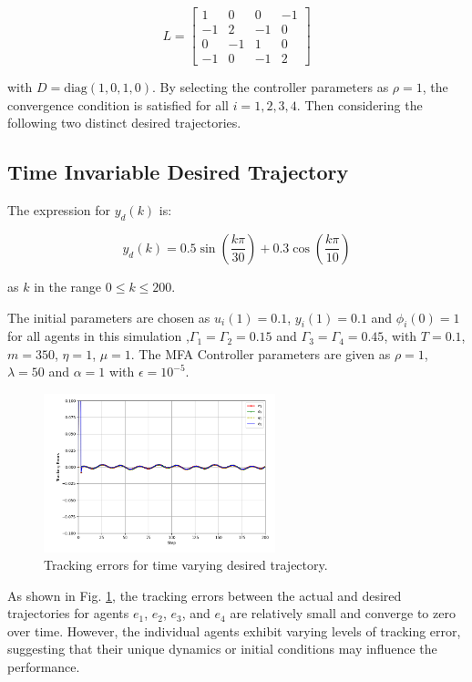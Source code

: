 \documentclass[journal,onecolumn]{IEEEtran}
\begin{document}
\[
    L = \begin{bmatrix}
    1 & 0 & 0 & -1 \\
    -1 & 2 & -1 & 0 \\
    0 & -1 & 1 & 0 \\
    -1 & 0 & -1 & 2
    \end{bmatrix}
\]

with \( D = \text{diag}(1, 0, 1, 0) \). By selecting the controller parameters as \( \rho = 1 \), the convergence condition  is satisfied for all \( i = 1, 2, 3, 4 \). Then considering the following two distinct desired trajectories.


\subsection{Time Invariable Desired Trajectory}

The expression for \( y_d(k) \) is:

\[
y_d(k) = 0.5 \sin\left(\frac{k \pi}{30}\right) + 0.3  \cos\left(\frac{k \pi}{10}\right)
\]

as \( k \) in the range \( 0 \leq k \leq 200 \).

The initial parameters are chosen as \(u_i(1)=0.1\), \(y_i(1)=0.1\) and \(\phi_i(0)=1 \) for all agents in this simulation ,\(\Gamma_{1}=\Gamma_{2}=0.15\) and \(\Gamma_{3}=\Gamma_{4}=0.45\), with \(T=0.1\), \(m=350\), \(\eta=1\), \(\mu=1\). The MFA Controller parameters are given as \(\rho=1\), \(\lambda=50\) and \(\alpha=1\) with \(\epsilon=10^{-5}\).
\begin{figure}[h!]
    \centering
    \includegraphics[width=0.6\textwidth]{Figure_2.png}
    \caption{Tracking errors for time varying desired trajectory.}
    \label{fig:figure_2} %
\end{figure}

As shown in Fig. \ref{fig:figure_2}, the tracking errors between the actual and desired trajectories for agents $e_1$, $e_2$, $e_3$, and $e_4$ are relatively small and converge to zero over time. However, the individual agents exhibit varying levels of tracking error, suggesting that their unique dynamics or initial conditions may influence the performance.
\end{document}
